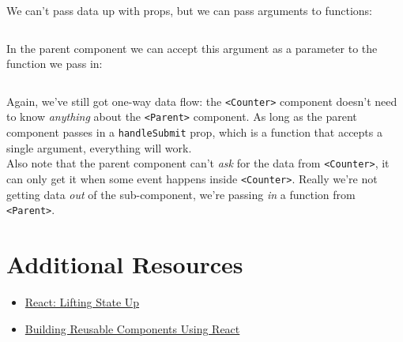 We can't pass data up with props, but we can pass arguments to functions:

\inputminted{jsx}{03/figures/02/08-Counter-with-parent.jsx}

In the parent component we can accept this argument as a parameter to the function we pass in:

\inputminted{jsx}{03/figures/02/09-Parent.jsx}

Again, we've still got one-way data flow: the \texttt{<Counter>} component doesn't need to know \textit{anything} about the \texttt{<Parent>} component. As long as the parent component passes in a \texttt{handleSubmit} prop, which is a function that accepts a single argument, everything will work.
\\

Also note that the parent component can't \textit{ask} for the data from \texttt{<Counter>}, it can only get it when some event happens inside \texttt{<Counter>}. Really we're not getting data \textit{out} of the sub-component, we're passing \textit{in} a function from \texttt{<Parent>}.


\section{Additional Resources}

\begin{itemize}[leftmargin=*]
    \item \href{https://reactjs.org/docs/lifting-state-up.html}{React: Lifting State Up}
    \item \href{https://buttercms.com/blog/building-reusable-components-using-react}{Building Reusable Components Using React}
\end{itemize}
